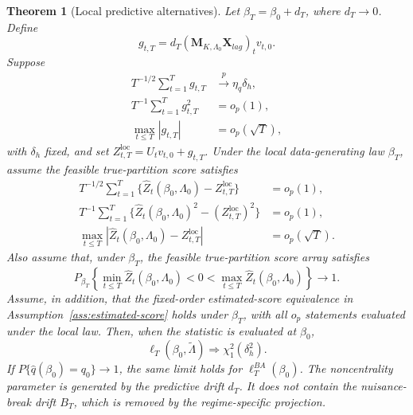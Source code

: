 \documentclass[12pt]{article} %
\numberwithin{equation}{section}
\newtheorem{theorem}{Theorem}
\theoremstyle{definition}
\begin{document}
\begin{theorem}[Local predictive alternatives]
\label{thm:local-power}
Let \(\beta_T=\beta_0+d_T\), where \(d_T\to0\). Define
\[
    g_{t,T}
    =
    d_T(\bm M_{K,\Lambda_0}\bm X_{lag})_tv_{t,0}.
\]
Suppose
\begin{align}
    T^{-1/2}\sum_{t=1}^Tg_{t,T}&\xrightarrow{p}\eta_q\delta_h,
    \label{eq:local-drift}\\
    T^{-1}\sum_{t=1}^Tg_{t,T}^2&=o_p(1),
    \label{eq:local-l2}\\
    \max_{t\leq T}|g_{t,T}|&=o_p(\sqrt T),
    \label{eq:local-max}
\end{align}
with \(\delta_h\) fixed, and set \(Z_{t,T}^{\mathrm{loc}}=U_tv_{t,0}+g_{t,T}\). Under the local data-generating law \(\beta_T\), assume the feasible true-partition score satisfies
\begin{align}
    T^{-1/2}\sum_{t=1}^T
    \{\widehat Z_t(\beta_0,\Lambda_0)-Z_{t,T}^{\mathrm{loc}}\}
    &=o_p(1),
    \label{eq:local-repl-num}\\
    T^{-1}\sum_{t=1}^T
    \{\widehat Z_t(\beta_0,\Lambda_0)^2-(Z_{t,T}^{\mathrm{loc}})^2\}
    &=o_p(1),
    \label{eq:local-repl-den}\\
    \max_{t\leq T}
    |\widehat Z_t(\beta_0,\Lambda_0)-Z_{t,T}^{\mathrm{loc}}|
    &=o_p(\sqrt T).
    \label{eq:local-repl-max}
\end{align}
Also assume that, under \(\beta_T\), the feasible true-partition score array satisfies
\[
    P_{\beta_T}\left\{
    \min_{t\leq T}\widehat Z_t(\beta_0,\Lambda_0)<0<
    \max_{t\leq T}\widehat Z_t(\beta_0,\Lambda_0)
    \right\}\to1.
\]
Assume, in addition, that the fixed-order estimated-score equivalence in Assumption~\ref{ass:estimated-score} holds under \(\beta_T\), with all \(o_p\) statements evaluated under the local law. Then, when the statistic is evaluated at \(\beta_0\),
\[
    \ell_T(\beta_0,\widetilde\Lambda)
    \Rightarrow
    \chi_1^2(\delta_h^2).
\]
If \(P\{\widehat q(\beta_0)=q_0\}\to1\), the same limit holds for \(\ell_T^{BA}(\beta_0)\). The noncentrality parameter is generated by the predictive drift \(d_T\). It does not contain the nuisance-break drift \(B_T\), which is removed by the regime-specific projection.
\end{theorem}
\end{document}
